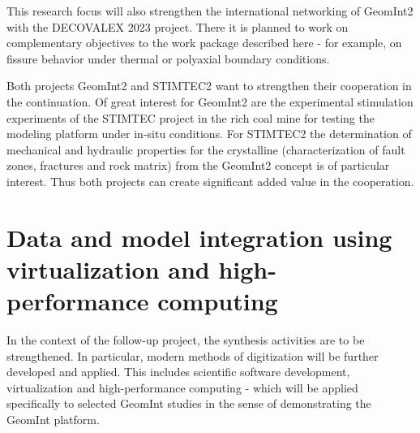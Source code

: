 This research focus will also strengthen the international networking of GeomInt2 with the DECOVALEX 2023 project. There it is planned to work on complementary objectives to the work package described here - for example, on fissure behavior under thermal or polyaxial boundary conditions. 

Both projects GeomInt2 and STIMTEC2 want to strengthen their cooperation in the continuation. Of great interest for GeomInt2 are the experimental stimulation experiments of the STIMTEC project in the rich coal mine \cite{steeb-2020c} for testing the modeling platform under in-situ conditions. For STIMTEC2 the determination of mechanical and hydraulic properties for the crystalline (characterization of fault zones, fractures and rock matrix) from the GeomInt2 concept is of particular interest. Thus both projects can create significant added value in the cooperation.


\section[Data and model integration]{Data and model integration using virtualization and high-performance computing}

In the context of the follow-up project, the synthesis activities are to be strengthened. In particular, modern methods of digitization will be further developed and applied. This includes scientific software development, virtualization and high-performance computing - which will be applied specifically to selected GeomInt studies in the sense of demonstrating the GeomInt platform.

